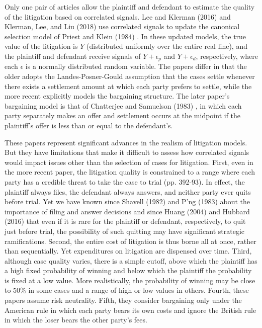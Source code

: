 \documentclass{article}
\begin{document}
Only one pair of articles allow the plaintiff and defendant to estimate the quality of the litigation based on correlated signals. Lee and Klerman (2016) \cite{leeklerman} and Klerman, Lee, and Liu (2018) \cite{klermanleeliu} use correlated signals to update the canonical selection model of Priest and Klein (1984) \cite{priestklein}. In these updated models, the true value of the litigation is $Y$ (distributed uniformly over the entire real line), and the plaintiff and defendant receive signals of $Y + \epsilon_p$ and $Y + \epsilon_d$, respectively, where each $\epsilon$ is a normally distributed random variable. The papers differ in that the older adopts the Landes-Posner-Gould assumption that the cases settle whenever there exists a settlement amount at which each party prefers to settle, while the more recent explicitly models the bargaining structure. The later paper's bargaining model is that of Chatterjee and Samuelson (1983) \cite{chatterjeesamuelson}, in which each party separately makes an offer and settlement occurs at the midpoint if the plaintiff's offer is less than or equal to the defendant's. 

These papers represent significant advances in the realism of litigation models. But they have limitations that make it difficult to assess how correlated signals would impact issues other than the selection of cases for litigation. First, even in the more recent paper, the litigation quality is constrained to a range where each party has a credible threat to take the case to trial (pp. 392-93). In effect, the plaintiff always files, the defendant always answers, and neither party ever quits before trial. Yet we have known since Shavell (1982) \cite{shavell} and P'ng (1983) \cite{png} about the importance of filing and answer decisions and since Huang (2004) \cite{huang} and Hubbard (2016) \cite{hubbard} that even if it is rare for the plaintiff or defendant, respectively, to quit just before trial, the possibility of such quitting may have significant strategic ramifications. Second, the entire cost of litigation is thus borne all at once, rather than sequentially. Yet expenditures on litigation are dispensed over time. Third, although case quality varies, there is a simple cutoff, above which the plaintiff has a high fixed probability of winning and below which the plaintiff the probability is fixed at a low value. More realistically, the probability of winning may be close to 50\% in some cases and a range of high or low values in others. Fourth, these papers assume risk neutrality. Fifth, they consider bargaining only under the American rule in which each party bears its own costs and ignore the British rule in which the loser bears the other party's fees. 
\end{document}
